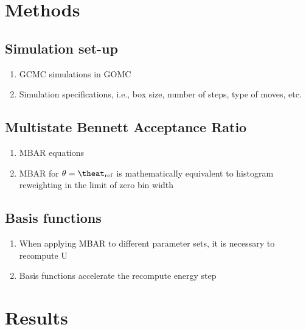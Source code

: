 \documentclass[11pt,a4paper]{article}
\begin{document}
\section{Methods}

\subsection{Simulation set-up}

\begin{enumerate}
	\item GCMC simulations in GOMC
	\item Simulation specifications, i.e., box size, number of steps, type of moves, etc.
\end{enumerate}

\subsection{Multistate Bennett Acceptance Ratio}

\begin{enumerate}
	\item MBAR equations
	\item MBAR for $\theta = \theat_{\rm ref}$ is mathematically equivalent to histogram reweighting in the limit of zero bin width
\end{enumerate}

\subsection{Basis functions}

\begin{enumerate}
	\item When applying MBAR to different parameter sets, it is necessary to recompute U
	\item Basis functions accelerate the recompute energy step
\end{enumerate}

\section{Results}
\end{document}
